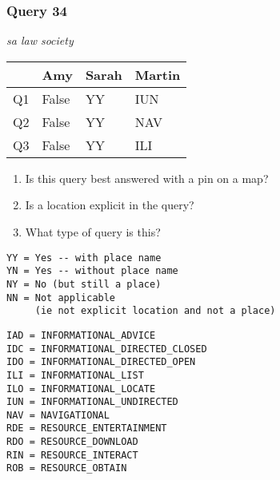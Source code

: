 \begin{frame}[fragile]
\frametitle{Query 34}
\vspace{1em}

\emph{sa law society}

\vfill

\begin{table}
  \centering
  \begin{tabular}{ l l l l }
    & \textbf{Amy} & \textbf{Sarah} & \textbf{Martin}\\
    \toprule
    Q1 & False & YY & IUN\\
Q2 & False & YY & NAV\\
Q3 & False & YY & ILI\\
    \bottomrule
  \end{tabular}
\end{table}

\vfill

\tiny{

\begin{enumerate}
\item Is this query best answered with a pin on a map?
\item Is a location explicit in the query?
\item What type of query is this?
\end{enumerate}

\vfill

\begin{multicols}{2}
\begin{verbatim}
YY = Yes -- with place name
YN = Yes -- without place name
NY = No (but still a place)
NN = Not applicable 
     (ie not explicit location and not a place)
\end{verbatim}

\columnbreak
\begin{verbatim}
IAD = INFORMATIONAL_ADVICE
IDC = INFORMATIONAL_DIRECTED_CLOSED
IDO = INFORMATIONAL_DIRECTED_OPEN
ILI = INFORMATIONAL_LIST
ILO = INFORMATIONAL_LOCATE
IUN = INFORMATIONAL_UNDIRECTED
NAV = NAVIGATIONAL
RDE = RESOURCE_ENTERTAINMENT
RDO = RESOURCE_DOWNLOAD
RIN = RESOURCE_INTERACT
ROB = RESOURCE_OBTAIN
\end{verbatim}
\end{multicols}
}

\end{frame}


